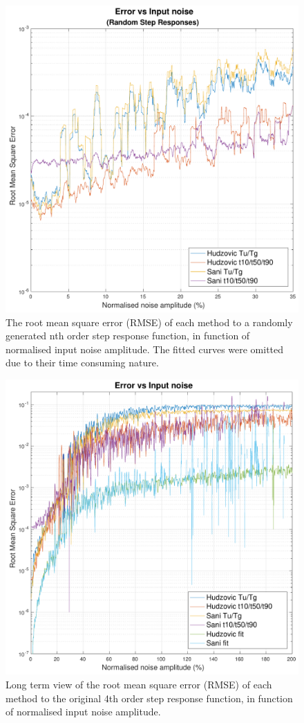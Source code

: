 \begin{figure}
    \includegraphics[width=\linewidth]{images/error_noise_random_steps}
    \caption{The root mean square error (RMSE) of each method to a randomly generated nth order step response function, in function of normalised input noise amplitude. The fitted curves were omitted due to their time consuming nature.}
    \label{fig:error_noise_random}
\end{figure}
\begin{figure}
    \includegraphics[width=\linewidth]{images/error_noise_long_term}
    \caption{Long term view of the root mean square error (RMSE) of each method to the original 4th order step response function, in function of normalised input noise amplitude.}
    \label{fig:error_noise_long_term}
\end{figure}


